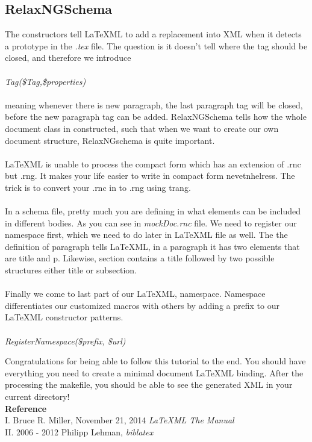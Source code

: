 \documentclass{book}
\begin{document}
\subsection{RelaxNGSchema}
The constructors tell \LaTeX ML to add a replacement into XML when it detects a prototype in the \emph{.tex} file. The question is it doesn't tell
where the tag should be closed, and therefore we introduce \\ \\
 \emph{Tag(\$Tag,\$properties)} \\ \\
 meaning whenever there is new paragraph, the last paragraph tag will be closed, before the new paragraph tag can be added. RelaxNGSchema
 tells how the whole document class in constructed, such that when we want to create our own document structure, RelaxNGschema is quite important. \\ \\
 \LaTeX ML is unable to process the compact form which has an extension of .rnc but .rng. It makes your life easier to write in compact form nevetnhelress.
 The trick is to convert your .rnc in to .rng using trang. \\ \\ 
 In a schema file, pretty much you are defining in what elements can be included in different bodies. 
 As you can see in \emph{mockDoc.rnc} file. We need to register our namespace first, which we need to do later in \LaTeX ML file as well.
 The the definition of paragraph tells \LaTeX ML, in a paragraph it has two elements that are title and p. Likewise, section contains a title followed by two possible \\
structures either title or subsection. \\ \\
Finally we come to last part of our \LaTeX ML, namespace. Namespace differentiates our customized macros with others by adding a prefix to our \LaTeX ML constructor patterns. \\ \\
\emph{RegisterNamespace(\$prefix, \$url) \\} 

Congratulations for being able to follow this tutorial to the end. You should have everything you need to create a minimal document \LaTeX ML binding. After the processing the makefile, you should be able to see the generated XML in your current directory! \\

\textbf{Reference} \\
 I. Bruce R. Miller, November 21, 2014 \emph{\LaTeX ML The Manual} \\
 II. 2006 - 2012 Philipp Lehman, \emph{biblatex}
\end{document}
